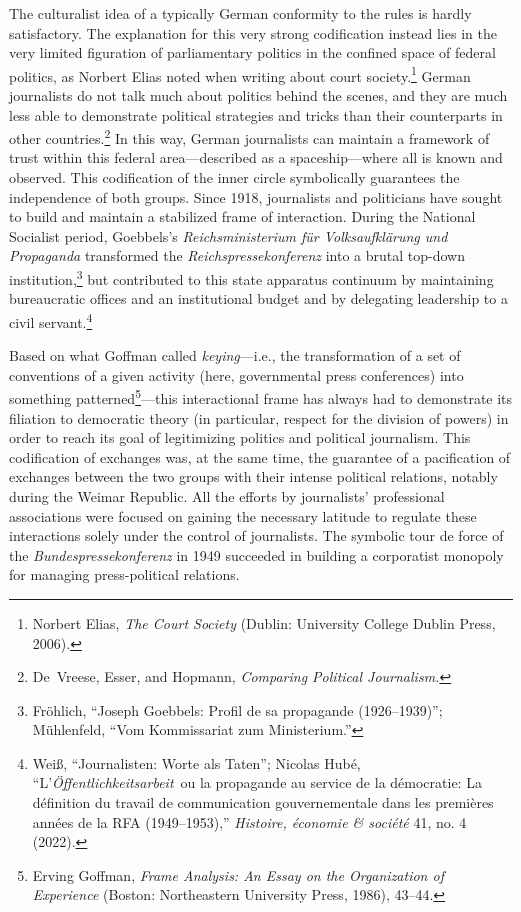 \documentclass{tufte-handout}
\begin{document}
The culturalist idea of a typically German conformity to the rules is
hardly satisfactory. The explanation for this very strong codification
instead lies in the very limited figuration of parliamentary politics in
the confined space of federal politics, as Norbert Elias noted when
writing about court society.\footnote{Norbert Elias, \emph{The Court
  Society} (Dublin: University College Dublin Press, 2006).} German
journalists do not talk much about politics behind the scenes, and they
are much less able to demonstrate political strategies and tricks than
their counterparts in other countries.\footnote{De~Vreese, Esser, and
  Hopmann, \emph{Comparing Political Journalism.}} In this way, German
journalists can maintain a framework of trust within this federal
area---described as a spaceship---where all is known and observed. This
codification of the inner circle symbolically guarantees the
independence of both groups. Since 1918, journalists and politicians
have sought to build and maintain a stabilized frame of interaction.
During the National Socialist period, Goebbels's \emph{Reichsministerium
für Volksaufklärung und Propaganda} transformed the
\emph{Reichspressekonferenz} into a brutal top-down
institution,\footnote{Fröhlich, ``Joseph Goebbels: Profil de sa
  propagande (1926--1939)''; Mühlenfeld, ``Vom Kommissariat zum
  Ministerium.''} but contributed to this state apparatus continuum by
maintaining bureaucratic offices and an institutional budget and by
delegating leadership to a civil servant.\footnote{Weiß, ``Journalisten:
  Worte als Taten''; Nicolas Hubé, ``L'\emph{Öffentlichkeitsarbeit}~ou
  la propagande au service de la démocratie: La définition du travail de
  communication gouvernementale dans les premières années de la RFA
  (1949--1953),'' \emph{Histoire, économie \& société} 41, no. 4 (2022).}

Based on what Goffman called \emph{keying}---i.e., the transformation of
a set of conventions of a given activity (here, governmental press
conferences) into something patterned\footnote{Erving Goffman,
  \emph{Frame Analysis: An Essay on the Organization of Experience}
  (Boston: Northeastern University Press, 1986), 43--44.}---this
interactional frame has always had to demonstrate its filiation to
democratic theory (in particular, respect for the division of powers) in
order to reach its goal of legitimizing politics and political
journalism. This codification of exchanges was, at the same time, the
guarantee of a pacification of exchanges between the two groups with
their intense political relations, notably during the Weimar Republic.
All the efforts by journalists' professional associations were focused
on gaining the necessary latitude to regulate these interactions solely
under the control of journalists. The symbolic tour de force of the
\emph{Bundespressekonferenz} in 1949 succeeded in building a corporatist
monopoly for managing press-political relations.
\end{document}
